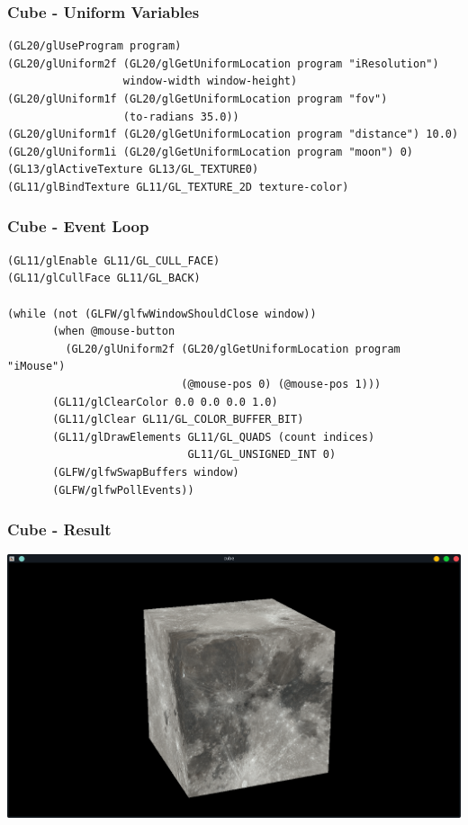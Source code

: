 \documentclass[aspectratio=169,11pt,xcolor=dvipsnames]{beamer}
\begin{document}
\begin{frame}[fragile]
  \frametitle{Cube {-} Uniform Variables}
  \begin{verbatim}
(GL20/glUseProgram program)
(GL20/glUniform2f (GL20/glGetUniformLocation program "iResolution")
                  window-width window-height)
(GL20/glUniform1f (GL20/glGetUniformLocation program "fov")
                  (to-radians 35.0))
(GL20/glUniform1f (GL20/glGetUniformLocation program "distance") 10.0)
(GL20/glUniform1i (GL20/glGetUniformLocation program "moon") 0)
(GL13/glActiveTexture GL13/GL_TEXTURE0)
(GL11/glBindTexture GL11/GL_TEXTURE_2D texture-color)
  \end{verbatim}
\end{frame}

\begin{frame}[fragile]
  \frametitle{Cube {-} Event Loop}
  \begin{verbatim}
(GL11/glEnable GL11/GL_CULL_FACE)
(GL11/glCullFace GL11/GL_BACK)

(while (not (GLFW/glfwWindowShouldClose window))
       (when @mouse-button
         (GL20/glUniform2f (GL20/glGetUniformLocation program "iMouse")
                           (@mouse-pos 0) (@mouse-pos 1)))
       (GL11/glClearColor 0.0 0.0 0.0 1.0)
       (GL11/glClear GL11/GL_COLOR_BUFFER_BIT)
       (GL11/glDrawElements GL11/GL_QUADS (count indices)
                            GL11/GL_UNSIGNED_INT 0)
       (GLFW/glfwSwapBuffers window)
       (GLFW/glfwPollEvents))
  \end{verbatim}
\end{frame}

\begin{frame}
  \frametitle{Cube {-} Result}
  \begin{center}
    \includegraphics[width=.8\textwidth]{cube}
  \end{center}
\end{frame}
\end{document}
